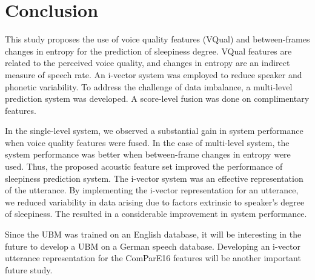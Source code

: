\section{Conclusion}
This study proposes the use of voice quality features (VQual) and between-frames changes in entropy for the prediction of sleepiness degree. VQual features are related to the perceived voice quality, and changes in entropy are an indirect measure of speech rate. An i-vector system was employed to reduce speaker and phonetic variability. To address the challenge of data imbalance, a multi-level prediction system was developed. A score-level fusion was done on complimentary features. 

In the single-level system, we observed a substantial gain in system performance when voice quality features were fused. In the case of multi-level system, the system performance was better when between-frame changes in entropy were used. Thus, the proposed acoustic feature set improved the performance of sleepiness prediction system. The i-vector system was an effective representation of the utterance. By implementing the i-vector representation for an utterance, we reduced variability in data arising due to factors extrinsic to speaker's degree of sleepiness. The resulted in a considerable improvement in system performance.  

Since the UBM was trained on an English database, it will be interesting in the future to develop a UBM on a German speech database. Developing an i-vector utterance representation for the ComParE16 features will be another important future study. 

